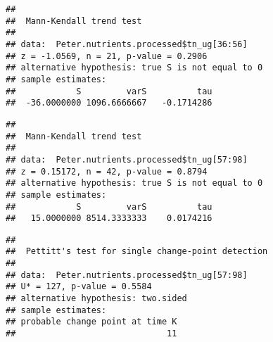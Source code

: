 \documentclass[]{article}
\newenvironment{Shaded}{\begin{snugshade}}{\end{snugshade}}
\newcommand{\KeywordTok}[1]{\textcolor[rgb]{0.13,0.29,0.53}{\textbf{#1}}}
\newcommand{\DecValTok}[1]{\textcolor[rgb]{0.00,0.00,0.81}{#1}}
\newcommand{\CommentTok}[1]{\textcolor[rgb]{0.56,0.35,0.01}{\textit{#1}}}
\newcommand{\OperatorTok}[1]{\textcolor[rgb]{0.81,0.36,0.00}{\textbf{#1}}}
\newcommand{\NormalTok}[1]{#1}
\begin{document}
\begin{verbatim}
## 
##  Mann-Kendall trend test
## 
## data:  Peter.nutrients.processed$tn_ug[36:56]
## z = -1.0569, n = 21, p-value = 0.2906
## alternative hypothesis: true S is not equal to 0
## sample estimates:
##            S         varS          tau 
##  -36.0000000 1096.6666667   -0.1714286
\end{verbatim}

\begin{Shaded}
\end{Shaded}

\begin{verbatim}
## 
##  Mann-Kendall trend test
## 
## data:  Peter.nutrients.processed$tn_ug[57:98]
## z = 0.15172, n = 42, p-value = 0.8794
## alternative hypothesis: true S is not equal to 0
## sample estimates:
##            S         varS          tau 
##   15.0000000 8514.3333333    0.0174216
\end{verbatim}

\begin{Shaded}
\end{Shaded}

\begin{verbatim}
## 
##  Pettitt's test for single change-point detection
## 
## data:  Peter.nutrients.processed$tn_ug[57:98]
## U* = 127, p-value = 0.5584
## alternative hypothesis: two.sided
## sample estimates:
## probable change point at time K 
##                              11
\end{verbatim}

\begin{Shaded}
\end{Shaded}
\end{document}
